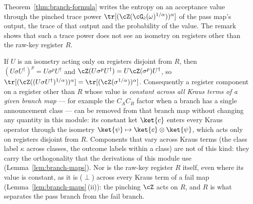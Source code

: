 
Theorem~\ref{thm:branch-formula} writes the entropy on an acceptance value
through the pinched trace power
$\tr[(\cZ(\cG_{\hat c}(\omega)^{1/\alpha}))^{\alpha}]$ of the pass map's
output, the trace of that output and the probability of the value. The
remark shows that such a trace power does not see an isometry on registers
other than the raw-key register $R$.

\begin{remark}\label{rem:inert}
If $U$ is an isometry acting only on registers disjoint from $R$, then
$(U\sigma U^{\dagger})^{p}=U\sigma^{p}U^{\dagger}$ and
$\cZ(U\sigma^{p}U^{\dagger})=U\cZ(\sigma^{p})U^{\dagger}$, so
$\tr[(\cZ((U\sigma U^{\dagger})^{1/\alpha}))^{\alpha}]
=\tr[(\cZ(\sigma^{1/\alpha}))^{\alpha}]$. Consequently a register component
on a register other than $R$ whose value is \emph{constant across all Kraus
terms of a given branch map} --- for example the $C_AC_B$ factor when a
branch has a single announcement class --- can be removed from that branch
map without changing any quantity in this module: its constant ket
$\ket{c}$ enters every Kraus operator through the isometry
$\ket{\psi}\mapsto\ket{c}\otimes\ket{\psi}$, which acts only on registers
disjoint from $R$. Components that vary across Kraus terms (the class label
$\kappa$ across classes, the outcome labels within a class) are not of this
kind: they carry the orthogonality that the derivations of this module use
(Lemma~\ref{lem:branch-maps}). Nor is the raw-key register $R$ itself, even
where its value is constant, as it is ($\perp$) across every Kraus term of
a fail map (Lemma~\ref{lem:branch-maps}\,(ii)): the pinching $\cZ$ acts on
$R$, and $R$ is what separates the pass branch from the fail branch.
\end{remark}
